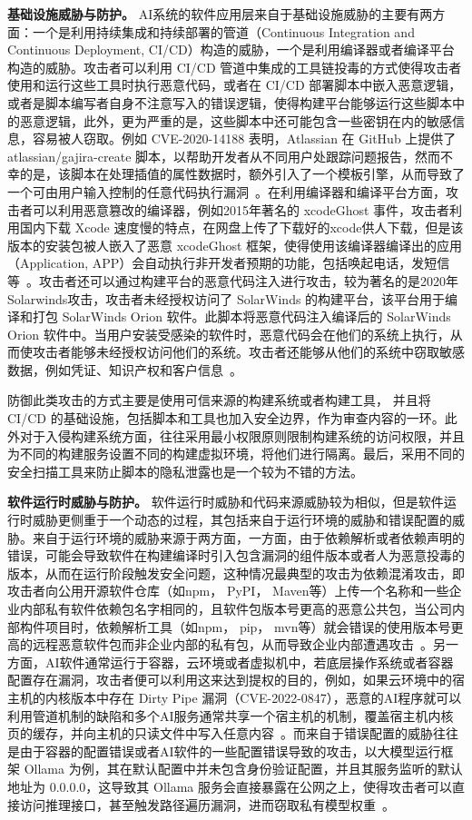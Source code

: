 \textbf{基础设施威胁与防护。}
AI系统的软件应用层来自于基础设施威胁的主要有两方面：一个是利用持续集成和持续部署的管道（Continuous Integration and Continuous Deployment, CI/CD）构造的威胁，一个是利用编译器或者编译平台构造的威胁。攻击者可以利用 CI/CD 管道中集成的工具链投毒的方式使得攻击者使用和运行这些工具时执行恶意代码，或者在 CI/CD 部署脚本中嵌入恶意逻辑，或者是脚本编写者自身不注意写入的错误逻辑，使得构建平台能够运行这些脚本中的恶意逻辑，此外，更为严重的是，这些脚本中还可能包含一些密钥在内的敏感信息，容易被人窃取。例如 CVE-2020-14188 表明，Atlassian 在 GitHub 上提供了 atlassian/gajira-create 脚本，以帮助开发者从不同用户处跟踪问题报告，然而不幸的是，该脚本在处理插值的属性数据时，额外引入了一个模板引擎，从而导致了一个可由用户输入控制的任意代码执行漏洞~\cite{pan2023ambush, CVE-2020-14188}。在利用编译器和编译平台方面，攻击者可以利用恶意篡改的编译器，例如2015年著名的 xcodeGhost 事件，攻击者利用国内下载 Xcode 速度慢的特点，在网盘上传了下载好的xcode供人下载，但是该版本的安装包被人嵌入了恶意 xcodeGhost 框架，使得使用该编译器编译出的应用（Application, APP）会自动执行非开发者预期的功能，包括唤起电话，发短信等~\cite{gui2016analysis}。攻击者还可以通过构建平台的恶意代码注入进行攻击，较为著名的是2020年Solarwinds攻击，攻击者未经授权访问了 SolarWinds 的构建平台，该平台用于编译和打包 SolarWinds Orion 软件。此脚本将恶意代码注入编译后的 SolarWinds Orion 软件中。当用户安装受感染的软件时，恶意代码会在他们的系统上执行，从而使攻击者能够未经授权访问他们的系统。攻击者还能够从他们的系统中窃取敏感数据，例如凭证、知识产权和客户信息~\cite{tran2021solarwinds}。

防御此类攻击的方式主要是使用可信来源的构建系统或者构建工具， 并且将 CI/CD 的基础设施，包括脚本和工具也加入安全边界，作为审查内容的一环。此外对于入侵构建系统方面，往往采用最小权限原则限制构建系统的访问权限，并且为不同的构建服务设置不同的构建虚拟环境，将他们进行隔离。最后，采用不同的安全扫描工具来防止脚本的隐私泄露也是一个较为不错的方法。

\textbf{软件运行时威胁与防护。}
软件运行时威胁和代码来源威胁较为相似，但是软件运行时威胁更侧重于一个动态的过程，其包括来自于运行环境的威胁和错误配置的威胁。来自于运行环境的威胁来源于两方面，一方面，由于依赖解析或者依赖声明的错误，可能会导致软件在构建编译时引入包含漏洞的组件版本或者人为恶意投毒的版本，从而在运行阶段触发安全问题，这种情况最典型的攻击为依赖混淆攻击，即攻击者向公用开源软件仓库（如npm， PyPI， Maven等）上传一个名称和一些企业内部私有软件依赖包名字相同的，且软件包版本号更高的恶意公共包，当公司内部构件项目时，依赖解析工具（如npm， pip， mvn等）就会错误的使用版本号更高的远程恶意软件包而非企业内部的私有包，从而导致企业内部遭遇攻击~\cite{ding2024security}。另一方面，AI软件通常运行于容器，云环境或者虚拟机中，若底层操作系统或者容器配置存在漏洞，攻击者便可以利用这来达到提权的目的，例如，如果云环境中的宿主机的内核版本中存在 Dirty Pipe 漏洞（CVE-2022-0847），恶意的AI程序就可以利用管道机制的缺陷和多个AI服务通常共享一个宿主机的机制，覆盖宿主机内核页的缓存，并向主机的只读文件中写入任意内容~\cite{tanwar2022study}。而来自于错误配置的威胁往往是由于容器的配置错误或者AI软件的一些配置错误导致的攻击，以大模型运行框架 Ollama 为例，其在默认配置中并未包含身份验证配置，并且其服务监听的默认地址为 0.0.0.0，这导致其 Ollama 服务会直接暴露在公网之上，使得攻击者可以直接访问推理接口，甚至触发路径遍历漏洞，进而窃取私有模型权重~\cite{cnvd_2025_04094,nvd_cve_2024_37032}。

